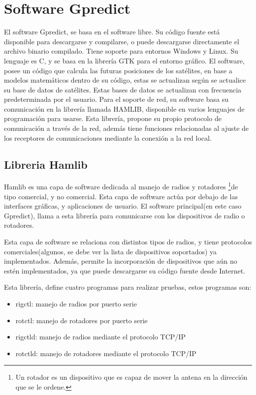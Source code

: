 \section{Software Gpredict} 
El software Gpredict, se basa en el software libre. Su código fuente está disponible para descargarse y compilarse, o puede descargarse directamente el archivo binario compilado. Tiene soporte para entornos Windows y Linux. Su lenguaje es C, y se basa en la librería GTK para el entorno gráfico. El software, posee un código que calcula las futuras posiciones de los satélites, en base a modelos matemáticos dentro de su código, estas se actualizan según se actualice su base de datos de satélites. Estas bases de datos se actualizan con frecuencia predeterminada por el usuario.  
Para el soporte de red, su software basa su comunicación en la librería llamada HAMLIB, disponible en varios lenguajes de programación para usarse. Esta librería, propone su propio protocolo de comunicación a través de la red, además tiene funciones relacionadas al ajuste de los receptores de comunicaciones mediante la conexión a la red local.   

\subsection{Libreria Hamlib}
Hamlib es una capa de software dedicada al manejo de radios y rotadores \footnote{Un rotador es un dispositivo que es capaz de mover la antena en la dirección que se le ordene.}de tipo comercial, y no comercial. Esta capa de software actúa por debajo de las interfaces gráficas, y aplicaciones de usuario. El software principal(en este caso Gpredict), llama a esta librería para comunicarse con los dispositivos de radio o rotadores. 

Esta capa de software se relaciona con distintos tipos de radios, y tiene protocolos comerciales(algunos, se debe ver la lista de dispositivos soportados) ya implementados. Además, permite la incorporación de dispositivos que aún no estén implementados, ya que puede descargarse su código fuente desde Internet. 

Esta librería, define cuatro programas para realizar pruebas, estos programas son: 
\begin{itemize}
	\item rigctl: manejo de radios por puerto serie 
	\item rotctl: manejo de rotadores por puerto serie
	\item rigctld: manejo de radios mediante el protocolo TCP/IP
	\item rotctld: manejo de rotadores mediante el protocolo TCP/IP
\end{itemize}

